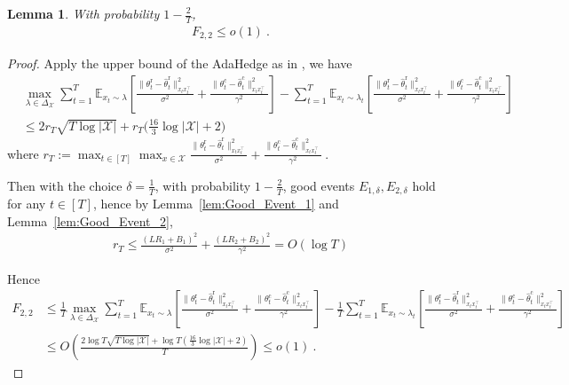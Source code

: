 \documentclass[accepted]{uai2025} %
\theoremstyle{plain}
\newtheorem{lemma}[theorem]{Lemma}
\theoremstyle{definition}
\theoremstyle{remark}
\newcommand{\hthetact}{\hat{\theta}_t^{\mathrm{c}}}
\newcommand{\hthetart}{\hat{\theta}_t^{\mathrm{r}}}
\begin{document}
\begin{lemma}
\label{lem:Regret_F22}
With probability $1-\frac{2}{T}$,
    \begin{align*}
        F_{2,2}\le o(1)~.
    \end{align*}
\end{lemma}
\begin{proof}
    Apply the upper bound of the AdaHedge as in \cite{de2014follow}, we have
    \begin{align*}
        &\max_{\lambda\in\Delta_{\mathcal{X}}} 
\sum_{t=1}^{T} \mathbb{E}_{ x_t\sim \lambda} 
\left[ \frac{\|\theta_t^\mathrm{r} - \hthetart\|_{x_t x_t^\top}^2}{\sigma^2} 
+ \frac{\|\theta_t^\mathrm{c} - \hthetact\|_{x_t x_t^\top}^2}{\gamma^2}  \right] 
- \sum_{t=1}^{T} \mathbb{E}_{ x_t\sim \lambda_t} 
\left[ \frac{\|\theta_t^\mathrm{r} - \hthetart\|_{x_t x_t^\top}^2}{\sigma^2} 
+ \frac{\|\theta_t^\mathrm{c} - \hthetact\|_{x_t x_t^\top}^2}{\gamma^2}\right]
\\&\le 2 r_T\sqrt{T\log |\mathcal{X}|}+r_T\Big(\frac{16}{3}\log |\mathcal{X}|+2\Big)
    \end{align*}
    where $r_T:=\max_{t\in [T]} \max_{x\in\mathcal{X}}\frac{\|\theta_t^\mathrm{r} - \hthetart\|_{x_t x_t^\top}^2}{\sigma^2} 
+ \frac{\|\theta_t^\mathrm{c} - \hthetact\|_{x_t x_t^\top}^2}{\gamma^2}~.$

Then with the choice $\delta=\frac{1}{T}$, with probability $1-\frac{2}{T}$, good events $E_{1,\delta}, E_{2,\delta}$ hold for any $t\in [T]$, hence by Lemma~\ref{lem:Good_Event_1} and Lemma~\ref{lem:Good_Event_2}, 
\begin{align*}
    r_T\le \frac{(LR_1+B_1)^2}{\sigma^2}+\frac{(LR_2+B_2)^2}{\gamma^2}=O(\log T)
\end{align*}

Hence
\begin{align*}
    F_{2,2}&\le \frac{1}{T}\max_{\lambda\in\Delta_{\mathcal{X}}} 
\sum_{t=1}^{T} \mathbb{E}_{ x_t\sim \lambda} 
\left[ \frac{\|\theta_t^\mathrm{r} - \hthetart\|_{x_t x_t^\top}^2}{\sigma^2} 
+ \frac{\|\theta_t^\mathrm{c} - \hthetact\|_{x_t x_t^\top}^2}{\gamma^2}  \right] 
- \frac{1}{T}\sum_{t=1}^{T} \mathbb{E}_{ x_t\sim \lambda_t} 
\left[ \frac{\|\theta_t^\mathrm{r} - \hthetart\|_{x_t x_t^\top}^2}{\sigma^2} 
+ \frac{\|\theta_t^\mathrm{c} - \hthetact\|_{x_t x_t^\top}^2}{\gamma^2}\right]
\\&\le O\left(  \frac{2 \log T\sqrt{T\log |\mathcal{X}|}+\log T(\frac{16}{3}\log |\mathcal{X}|+2)}{T}\right)
 \le o(1)~.
\end{align*}

\end{proof}
\end{document}
